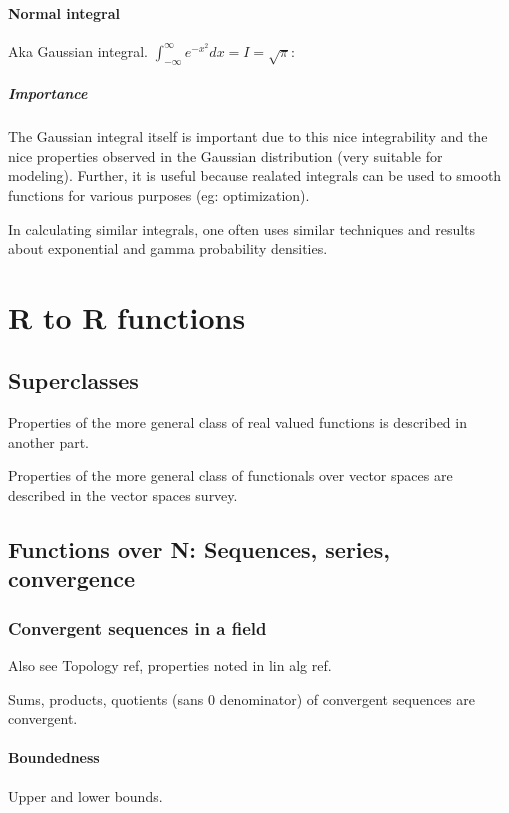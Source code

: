 \documentclass[oneside, article]{memoir}
\begin{document}
\subsection{Normal integral}
Aka Gaussian integral.
$\int_{-\infty}^{\infty}e^{-x^{2}}dx = I = \sqrt{\pi}$: \\

\subsubsection{Importance}
The Gaussian integral itself is important due to this nice integrability and the nice properties observed in the Gaussian distribution (very suitable for modeling). Further, it is useful because realated integrals can be used to smooth functions for various purposes (eg: optimization).

In calculating similar integrals, one often uses similar techniques and results about exponential and gamma probability densities.

\part{R to R functions}
\chapter{Superclasses}
Properties of the more general class of real valued functions is described in another part.

Properties of the more general class of functionals over vector spaces are described in the vector spaces survey.

\chapter{Functions over N: Sequences, series, convergence}
\section{Convergent sequences  in a field}
Also see Topology ref, properties noted in lin alg ref.

Sums, products, quotients (sans 0 denominator) of convergent sequences are convergent.

\subsection{Boundedness}
Upper and lower bounds.
\end{document}
